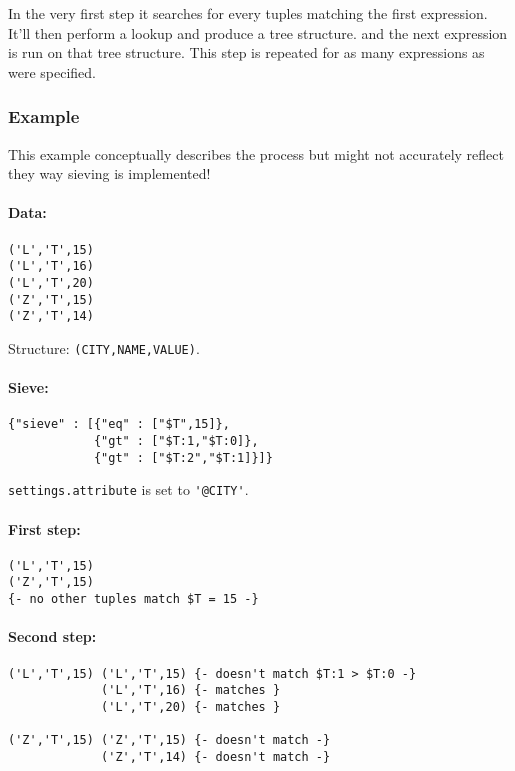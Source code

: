 \documentclass[a4paper]{article}
\begin{document}
In the very first step it searches for every tuples matching the first
expression. It'll then perform a lookup and produce a tree structure.
and the next expression is run on that tree structure. This step is
repeated for as many expressions as were specified.

\subsubsection{Example}

This example conceptually describes the process but might not
accurately reflect they way sieving is implemented!

\paragraph*{Data:} 

\begin{verbatim}
('L','T',15)
('L','T',16)
('L','T',20)
('Z','T',15)
('Z','T',14)
\end{verbatim}

Structure: \verb|(CITY,NAME,VALUE)|.

\paragraph*{Sieve:}

\begin{verbatim}
{"sieve" : [{"eq" : ["$T",15]},
            {"gt" : ["$T:1,"$T:0]},
            {"gt" : ["$T:2","$T:1]}]}
\end{verbatim}

\verb|settings.attribute| is set to \verb|'@CITY'|.

\paragraph*{First step:}

\begin{verbatim}
('L','T',15)
('Z','T',15)
{- no other tuples match $T = 15 -}
\end{verbatim}

\paragraph*{Second step:}

\begin{verbatim}
('L','T',15) ('L','T',15) {- doesn't match $T:1 > $T:0 -}
             ('L','T',16) {- matches }
             ('L','T',20) {- matches }

('Z','T',15) ('Z','T',15) {- doesn't match -}
             ('Z','T',14) {- doesn't match -}
\end{verbatim}
\end{document}
